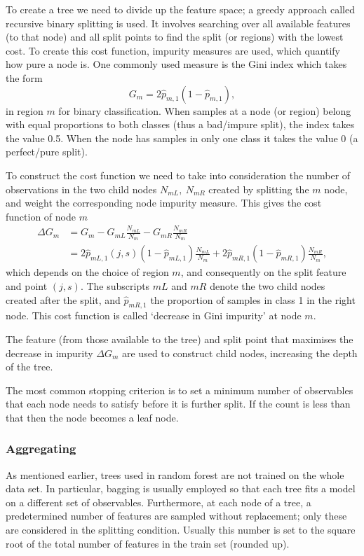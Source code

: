To create a tree we need to divide up the feature space; a greedy approach called recursive binary splitting is used. It involves searching over all available features (to that node) and all split points to find the split (or regions) with the lowest cost.  To create this cost function, impurity measures are used, which quantify how pure a node is.
One commonly used  measure is the Gini index which takes the form
\begin{equation}
	G_m = 2\hat{p}_{m,1}(1-\hat{p}_{m,1}),
\end{equation}
in region $m$ for binary classification. When samples at a node (or region)  belong  with equal proportions to both classes (thus a bad/impure split), the index takes the value 0.5. When the node has samples in only one class it takes the value 0 (a perfect/pure split).

To construct the cost function we need to take into consideration the number of observations in the two child nodes $N_{mL},\ N_{mR}$ created by splitting the $m$ node, and weight the corresponding node impurity measure. This gives the cost function of node $m$ 
\begin{align}
	\Delta G_m &=G_m - G_{mL} \frac{N_{mL}}{N_m} - G_{mR}\frac{N_{mR}}{N_m}\\ &=2\hat{p}_{mL,1}(j,s)(1-\hat{p}_{mL,1})\frac{N_{mL}}{N_m} + 2\hat{p}_{mR,1}(1-\hat{p}_{mR,1})\frac{N_{mR}}{N_m},
	\label{eq:decreaseimpurity}
\end{align}
which depends on the choice of region $m$, and consequently on the split feature and point $(j,s)$. The subscripts $mL$ and $mR$ denote the two child nodes created after the split, and $\hat{p}_{mR,1}$ the proportion of samples in class 1 in the right node. This cost function is called `decrease in Gini impurity' at node $m$.

The feature (from those available to the tree) and split point that maximises the decrease in impurity $\Delta G_m$ are used to construct child nodes, increasing the depth of the tree.

The most common stopping criterion is to set a minimum number of observables that each node needs to satisfy before it is further split. If the count is less than that then the node becomes a leaf node.  

\subsubsection{Aggregating}
As mentioned earlier, trees used in random forest are not trained on the whole data set. In particular, bagging is usually employed so that each tree fits a model on a different set of observables. Furthermore, at each node of a tree, a predetermined number of features are sampled without replacement; only these are considered in the splitting condition. Usually this number is set to the square root of the total number of features in the train set (rounded up).

